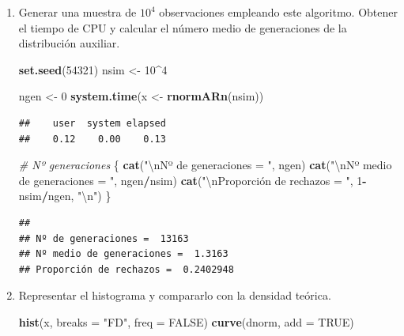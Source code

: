 \documentclass[
]{book}
\newenvironment{Shaded}{\begin{snugshade}}{\end{snugshade}}
\newcommand{\CharTok}[1]{\textcolor[rgb]{0.31,0.60,0.02}{#1}}
\newcommand{\CommentTok}[1]{\textcolor[rgb]{0.56,0.35,0.01}{\textit{#1}}}
\newcommand{\DataTypeTok}[1]{\textcolor[rgb]{0.13,0.29,0.53}{#1}}
\newcommand{\DecValTok}[1]{\textcolor[rgb]{0.00,0.00,0.81}{#1}}
\newcommand{\KeywordTok}[1]{\textcolor[rgb]{0.13,0.29,0.53}{\textbf{#1}}}
\newcommand{\NormalTok}[1]{#1}
\newcommand{\OperatorTok}[1]{\textcolor[rgb]{0.81,0.36,0.00}{\textbf{#1}}}
\newcommand{\OtherTok}[1]{\textcolor[rgb]{0.56,0.35,0.01}{#1}}
\newcommand{\StringTok}[1]{\textcolor[rgb]{0.31,0.60,0.02}{#1}}
\theoremstyle{break}
\theoremstyle{definition}
\theoremstyle{definition}
\theoremstyle{definition}
\theoremstyle{remark}
\begin{document}
\begin{enumerate}
\def\labelenumi{\alph{enumi})}
\item
  Generar una muestra de \(10^{4}\) observaciones empleando este
  algoritmo. Obtener el tiempo de CPU y calcular el número medio
  de generaciones de la distribución auxiliar.

\begin{Shaded}
\begin{Highlighting}[]
\KeywordTok{set.seed}\NormalTok{(}\DecValTok{54321}\NormalTok{)}
\NormalTok{nsim <-}\StringTok{ }\DecValTok{10}\OperatorTok{^}\DecValTok{4}

\NormalTok{ngen <-}\StringTok{ }\DecValTok{0}
\KeywordTok{system.time}\NormalTok{(x <-}\StringTok{ }\KeywordTok{rnormARn}\NormalTok{(nsim))}
\end{Highlighting}
\end{Shaded}

\begin{verbatim}
##    user  system elapsed 
##    0.12    0.00    0.13
\end{verbatim}

\begin{Shaded}
\begin{Highlighting}[]
\CommentTok{# Nº generaciones}
\NormalTok{\{}
\KeywordTok{cat}\NormalTok{(}\StringTok{"}\CharTok{\textbackslash{}n}\StringTok{Nº de generaciones = "}\NormalTok{, ngen)}
\KeywordTok{cat}\NormalTok{(}\StringTok{"}\CharTok{\textbackslash{}n}\StringTok{Nº medio de generaciones = "}\NormalTok{, ngen}\OperatorTok{/}\NormalTok{nsim)}
\KeywordTok{cat}\NormalTok{(}\StringTok{"}\CharTok{\textbackslash{}n}\StringTok{Proporción de rechazos = "}\NormalTok{, }\DecValTok{1}\OperatorTok{-}\NormalTok{nsim}\OperatorTok{/}\NormalTok{ngen, }\StringTok{"}\CharTok{\textbackslash{}n}\StringTok{"}\NormalTok{)}
\NormalTok{\}}
\end{Highlighting}
\end{Shaded}

\begin{verbatim}
## 
## Nº de generaciones =  13163
## Nº medio de generaciones =  1.3163
## Proporción de rechazos =  0.2402948
\end{verbatim}
\item
  Representar el histograma y compararlo con la densidad teórica.

\begin{Shaded}
\begin{Highlighting}[]
\KeywordTok{hist}\NormalTok{(x, }\DataTypeTok{breaks =} \StringTok{"FD"}\NormalTok{, }\DataTypeTok{freq =} \OtherTok{FALSE}\NormalTok{)}
\KeywordTok{curve}\NormalTok{(dnorm, }\DataTypeTok{add =} \OtherTok{TRUE}\NormalTok{)}
\end{Highlighting}
\end{Shaded}


\end{enumerate}
\end{document}
